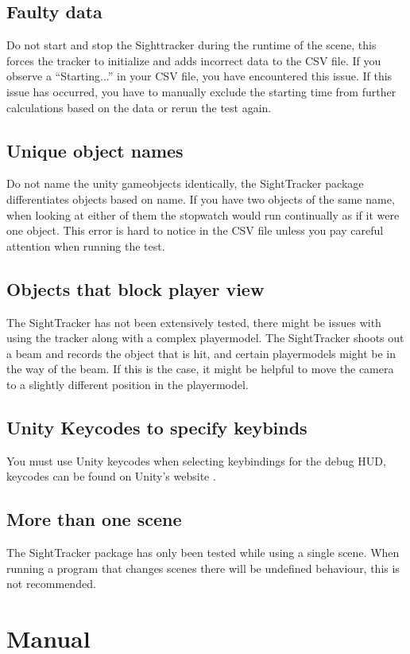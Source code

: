 \documentclass[letterpaper]{article}
\begin{document}
\subsection{Faulty data}
Do not start and stop the Sighttracker during the runtime of the scene, this forces the tracker to initialize and adds incorrect data to the CSV file. If you observe a “Starting...” in your CSV file, you have encountered this issue. If this issue has occurred, you have to manually exclude the starting time from further calculations based on the data or rerun the test again.
\subsection{Unique object names}
Do not name the unity gameobjects identically, the SightTracker package differentiates objects based on name. If you have two objects of the same name, when looking at either of them the stopwatch would run continually as if it were one object. This error is hard to notice in the CSV file unless you pay careful attention when running the test.
\subsection{Objects that block player view}
The SightTracker has not been extensively tested, there might be issues with using the tracker along with a complex playermodel. The SightTracker shoots out a beam and records the object that is hit, and certain playermodels might be in the way of the beam. If this is the case, it might be helpful to move the camera to a slightly different position in the playermodel.
\subsection{Unity Keycodes to specify keybinds}
You must use Unity keycodes when selecting keybindings for the debug HUD, keycodes can be found on Unity's website \cite{unitykeycode}.
\subsection{More than one scene}
The SightTracker package has only been tested while using a single scene. When running a program that changes scenes there will be undefined behaviour, this is not recommended.
\newpage
\section{Manual}
\end{document}
